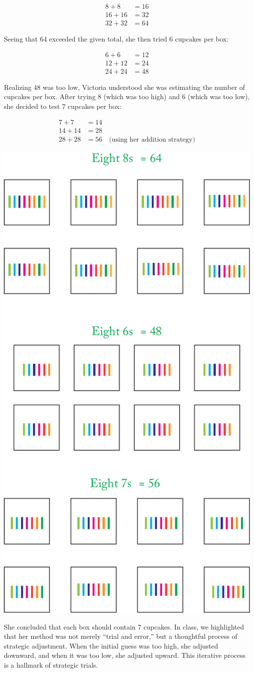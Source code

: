 \documentclass[11pt]{article}
\begin{document}
\begin{align*}
8 + 8 &= 16\\[5mm]
16 + 16 &= 32\\[5mm]
32 + 32 &= 64
\end{align*}

Seeing that 64 exceeded the given total, she then tried 6 cupcakes per box:

\begin{align*}
6 + 6 &= 12\\[5mm]
12 + 12 &= 24\\[5mm]
24 + 24 &= 48
\end{align*}

Realizing 48 was too low, Victoria understood she was estimating the number of cupcakes per box. After trying 8 (which was too high) and 6 (which was too low), she decided to test 7 cupcakes per box:

\begin{align*}
7 + 7 &= 14\\[5mm]
14 + 14 &= 28\\[5mm]
28 + 28 &= 56 \quad \text{(using her addition strategy)}
\end{align*}

\includegraphics[width=.5\textwidth]{images/Easy_Pictures/SMR_DIV_Strategic_Trials/PDF/SMR_DIV_Strategic_Trials.pdf}

She concluded that each box should contain 7 cupcakes. In class, we highlighted that her method was not merely ``trial and error,'' but a thoughtful process of strategic adjustment. When the initial guess was too high, she adjusted downward, and when it was too low, she adjusted upward. This iterative process is a hallmark of strategic trials.
\end{document}
